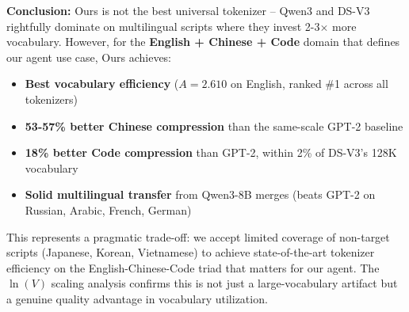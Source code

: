 \textbf{Conclusion:} Ours is not the best universal tokenizer -- Qwen3 and DS-V3 rightfully dominate on multilingual scripts where they invest 2-3$\times$ more vocabulary. However, for the \textbf{English + Chinese + Code} domain that defines our agent use case, Ours achieves:
\begin{itemize}
    \item \textbf{Best vocabulary efficiency} ($A=2.610$ on English, ranked \#1 across all tokenizers)
    \item \textbf{53-57\% better Chinese compression} than the same-scale GPT-2 baseline
    \item \textbf{18\% better Code compression} than GPT-2, within 2\% of DS-V3's 128K vocabulary
    \item \textbf{Solid multilingual transfer} from Qwen3-8B merges (beats GPT-2 on Russian, Arabic, French, German)
\end{itemize}

This represents a pragmatic trade-off: we accept limited coverage of non-target scripts (Japanese, Korean, Vietnamese) to achieve state-of-the-art tokenizer efficiency on the English-Chinese-Code triad that matters for our agent. The $\ln(V)$ scaling analysis confirms this is not just a large-vocabulary artifact but a genuine quality advantage in vocabulary utilization.
